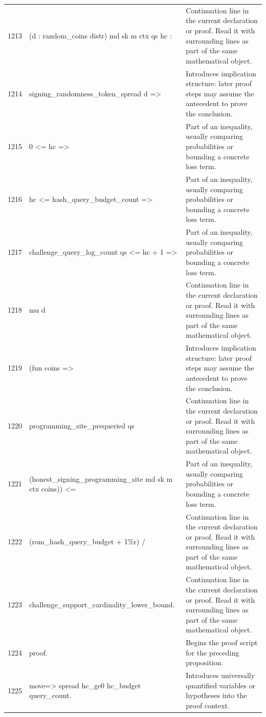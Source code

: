 \documentclass[10pt]{article}
\begin{document}
\begin{longtable}{r L{0.53\textwidth} L{0.37\textwidth}}
1213 & {\ttfamily\scriptsize   (d : random\_coins distr) md sk m ctx qs hc :} & Continuation line in the current declaration or proof.  Read it with surrounding lines as part of the same mathematical object. \\
1214 & {\ttfamily\scriptsize   signing\_randomness\_token\_spread d =>} & Introduces implication structure: later proof steps may assume the antecedent to prove the conclusion. \\
1215 & {\ttfamily\scriptsize   0 <= hc =>} & Part of an inequality, usually comparing probabilities or bounding a concrete loss term. \\
1216 & {\ttfamily\scriptsize   hc <= hash\_query\_budget\_count =>} & Part of an inequality, usually comparing probabilities or bounding a concrete loss term. \\
1217 & {\ttfamily\scriptsize   challenge\_query\_log\_count qs <= hc + 1 =>} & Part of an inequality, usually comparing probabilities or bounding a concrete loss term. \\
1218 & {\ttfamily\scriptsize   mu d} & Continuation line in the current declaration or proof.  Read it with surrounding lines as part of the same mathematical object. \\
1219 & {\ttfamily\scriptsize     (fun coins =>} & Introduces implication structure: later proof steps may assume the antecedent to prove the conclusion. \\
1220 & {\ttfamily\scriptsize       programming\_site\_prequeried qs} & Continuation line in the current declaration or proof.  Read it with surrounding lines as part of the same mathematical object. \\
1221 & {\ttfamily\scriptsize         (honest\_signing\_programming\_site md sk m ctx coins)) <=} & Part of an inequality, usually comparing probabilities or bounding a concrete loss term. \\
1222 & {\ttfamily\scriptsize   (rom\_hash\_query\_budget + 1\%r) /} & Continuation line in the current declaration or proof.  Read it with surrounding lines as part of the same mathematical object. \\
1223 & {\ttfamily\scriptsize     challenge\_support\_cardinality\_lower\_bound.} & Continuation line in the current declaration or proof.  Read it with surrounding lines as part of the same mathematical object. \\
1224 & {\ttfamily\scriptsize proof.} & Begins the proof script for the preceding proposition. \\
1225 & {\ttfamily\scriptsize move=> spread hc\_ge0 hc\_budget query\_count.} & Introduces universally quantified variables or hypotheses into the proof context. \\

\end{longtable}
\end{document}
